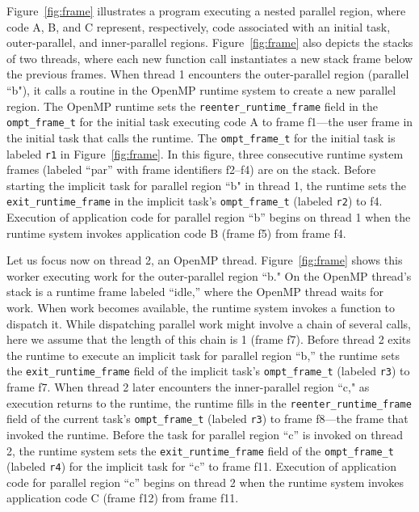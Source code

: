 \documentclass{article}
\begin{document}
{\noindent
Figure~\ref{fig:frame} illustrates a program executing a nested parallel region, where code A, B, and C represent, respectively, code associated with an initial task, outer-parallel, and inner-parallel regions.  Figure~\ref{fig:frame}  also depicts the stacks of two threads, where each new function call instantiates a new stack frame below the previous frames. When thread 1 encounters the outer-parallel region (parallel ``b"), it calls a routine in the OpenMP runtime system to create a new parallel region. The OpenMP runtime sets the \verb|reenter_runtime_frame| field in the \verb|ompt_frame_t| for the initial task executing code A to  frame f1---the user frame in the initial task that calls the runtime. The  \verb|ompt_frame_t| for the initial task is labeled  \verb|r1| in Figure~\ref{fig:frame}. In this figure, three consecutive runtime system frames (labeled ``par'' with frame identifiers f2--f4) are on the stack. 
Before starting the implicit task for parallel region ``b" in thread 1, the runtime sets the \verb|exit_runtime_frame| in the implicit task's \verb|ompt_frame_t|  (labeled \verb|r2|) to f4. Execution of application code for parallel region ``b''  begins on thread 1  when the runtime system invokes application code B (frame f5) from frame f4. 

Let us focus now on thread 2, an OpenMP thread. Figure~\ref{fig:frame}  shows this worker executing  work for the outer-parallel region ``b."
On the OpenMP thread's stack is a runtime frame labeled ``idle,'' where the OpenMP thread waits for work. 
When work becomes available, the runtime system invokes a function to dispatch it. While dispatching parallel work might involve a chain of several calls, here we assume that the length of this chain is 1 (frame f7).  Before thread 2 exits the runtime to execute an implicit task for parallel region ``b,'' the runtime 
sets the \verb|exit_runtime_frame| field of the implicit task's \verb|ompt_frame_t| (labeled \verb|r3|) to frame f7. 
When thread 2 later encounters the inner-parallel region ``c,"  as execution returns to the runtime,  the runtime fills in the  \verb|reenter_runtime_frame| field of the current task's \verb|ompt_frame_t| (labeled \verb|r3|) to frame f8---the frame that invoked the runtime. Before the task for parallel region ``c'' is invoked on thread 2, the runtime system sets the \verb|exit_runtime_frame| field  of the \verb|ompt_frame_t| (labeled \verb|r4|) for the implicit task for ``c'' 
to frame f11. Execution of application code for parallel region ``c''  begins on thread 2  when the runtime system invokes application code C (frame f12) from frame f11.


}
\end{document}
